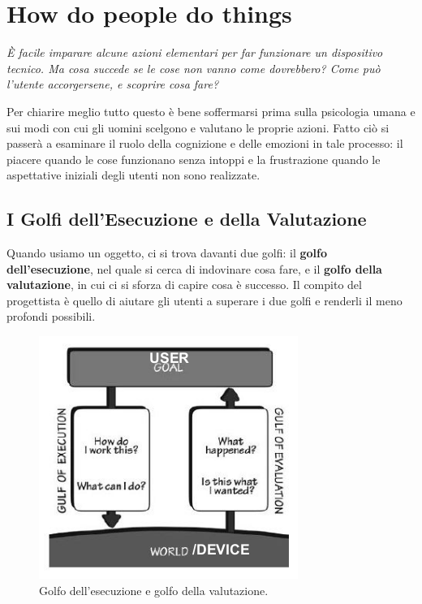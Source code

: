 \chapter{How do people do things}
\begin{flushleft}
	\textit{
		È facile imparare alcune azioni elementari per far funzionare un dispositivo tecnico. Ma cosa succede se le cose non vanno come dovrebbero? Come può l'utente accorgersene, e scoprire cosa fare? }
\end{flushleft}

Per chiarire meglio tutto questo è bene soffermarsi prima sulla psicologia umana e sui modi con cui gli uomini scelgono e valutano le proprie azioni. Fatto ciò si passerà a esaminare il ruolo della cognizione e delle emozioni in tale processo: il piacere quando le cose funzionano senza intoppi e la frustrazione quando le aspettative iniziali degli utenti non sono realizzate.

\section{I Golfi dell'Esecuzione e della Valutazione}
Quando usiamo un oggetto, ci si trova davanti due golfi: il \textbf{golfo dell'esecuzione}, nel quale si cerca di indovinare cosa fare, e il \textbf{golfo della valutazione}, in cui ci si sforza di capire cosa è successo. Il compito del progettista è quello di aiutare gli utenti a superare i due golfi e renderli il meno profondi possibili.

\begin{figure}[!h]
	\centering
	\includegraphics[scale=0.73]{../immagini/Golfi}
	\caption{Golfo dell'esecuzione e golfo della valutazione.}
\end{figure}

